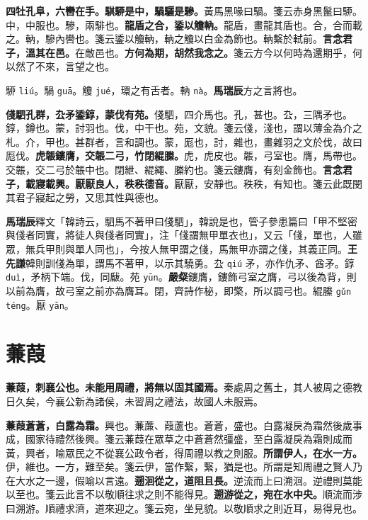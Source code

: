 \textbf{四牡孔阜，六轡在手。騏駵是中，騧驪是驂。}{\footnotesize 黃馬黑喙曰騧。箋云赤身黑鬣曰駵。中，中服也。驂，兩騑也。}\textbf{龍盾之合，鋈以觼軜。}{\footnotesize 龍盾，畫龍其盾也。合，合而載之。軜，驂內轡也。箋云鋈以觼軜，軜之觼以白金為飾也。軜繫於軾前。}\textbf{言念君子，溫其在邑。}{\footnotesize 在敵邑也。}\textbf{方何為期，胡然我念之。}{\footnotesize 箋云方今以何時為還期乎，何以然了不來，言望之也。}

\begin{quoting}駵 \texttt{liú}。騧 \texttt{guā}。觼 \texttt{jué}，環之有舌者。軜 \texttt{nà}。\textbf{馬瑞辰}方之言將也。\end{quoting}

\textbf{俴駟孔群，厹矛鋈錞，蒙伐有苑。}{\footnotesize 俴駟，四介馬也。孔，甚也。厹，三隅矛也。錞，鐏也。蒙，討羽也。伐，中干也。苑，文貌。箋云俴，淺也，謂以薄金為介之札。介，甲也。甚群者，言和調也。蒙，厖也，討，雜也，畫雜羽之文於伐，故曰厖伐。}\textbf{虎韔鏤膺，交韔二弓，竹閉緄縢。}{\footnotesize 虎，虎皮也。韔，弓室也。膺，馬帶也。交韔，交二弓於韔中也。閉紲、緄繩、縢約也。箋云鏤膺，有刻金飾也。}\textbf{言念君子，載寢載興。厭厭良人，秩秩德音。}{\footnotesize 厭厭，安靜也。秩秩，有知也。箋云此既閔其君子寢起之勞，又思其性與德也。}

\begin{quoting}\textbf{馬瑞辰}釋文「韓詩云，駟馬不著甲曰俴駟」，韓說是也，管子參患篇曰「甲不堅密與俴者同實，將徒人與俴者同實」，注「俴謂無甲單衣也」，又云「俴，單也，人雖眾，無兵甲則與單人同也」，今按人無甲謂之俴，馬無甲亦謂之俴，其義正同。\textbf{王先謙}韓則訓俴為單，謂馬不著甲，以示其驍勇。厹 \texttt{qiú} 矛，亦作仇矛、酋矛。錞 \texttt{duì}，矛柄下端。伐，同瞂。苑 \texttt{yūn}。\textbf{嚴粲}鏤膺，鏤飾弓室之膺，弓以後為背，則以前為膺，故弓室之前亦為膺耳。閉，齊詩作柲，即檠，所以調弓也。緄縢 \texttt{gǔn téng}。厭 \texttt{yān}。\end{quoting}

\section{蒹葭}


\textbf{蒹葭，刺襄公也。未能用周禮，將無以固其國焉。}{\footnotesize 秦處周之舊土，其人被周之德教日久矣，今襄公新為諸侯，未習周之禮法，故國人未服焉。}

\textbf{蒹葭蒼蒼，白露為霜。}{\footnotesize 興也。蒹薕、葭蘆也。蒼蒼，盛也。白露凝戾為霜然後歲事成，國家待禮然後興。箋云蒹葭在眾草之中蒼蒼然彊盛，至白露凝戾為霜則成而黃，興者，喻眾民之不從襄公政令者，得周禮以教之則服。}\textbf{所謂伊人，在水一方。}{\footnotesize 伊，維也。一方，難至矣。箋云伊，當作繄，繄，猶是也。所謂是知周禮之賢人乃在大水之一邊，假喻以言遠。}\textbf{遡洄從之，道阻且長。}{\footnotesize 逆流而上曰溯洄。逆禮則莫能以至也。箋云此言不以敬順往求之則不能得見。}\textbf{遡游從之，宛在水中央。}{\footnotesize 順流而涉曰溯游。順禮求濟，道來迎之。箋云宛，坐見貌。以敬順求之則近耳，易得見也。}


